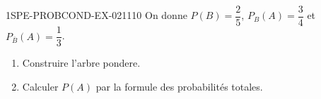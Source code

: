 \begin{exercice}{1SPE-PROBCOND-EX-021}{1}{10}
On donne $P(B) = \dfrac{2}{5}$, $P_B(A) = \dfrac{3}{4}$ et $P_{\overline{B}}(A) = \dfrac{1}{3}$.

\begin{enumerate}
  \item Construire l'arbre pondere.
  \item Calculer $P(A)$ par la formule des probabilités totales.
\end{enumerate}
\end{exercice}

